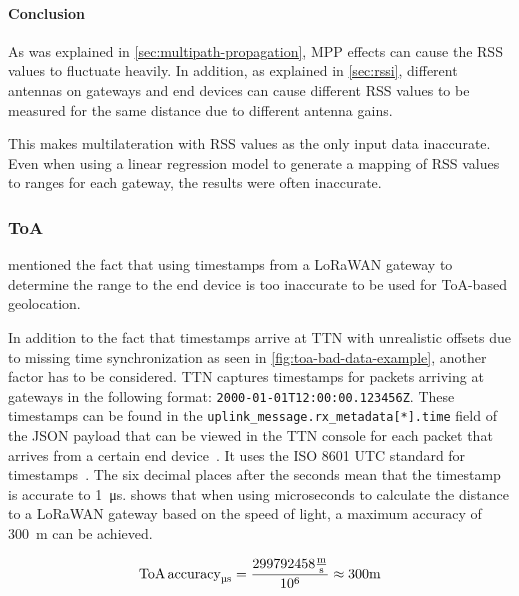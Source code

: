 \paragraph{Conclusion}

As was explained in \cref{sec:multipath-propagation}, \acl{MPP} effects can cause the \ac{RSS} values to fluctuate heavily.
In addition, as explained in \cref{sec:rssi}, different antennas on gateways and end devices can cause different \ac{RSS} values to be measured for the same distance due to different antenna gains.

This makes multilateration with \ac{RSS} values as the only input data inaccurate.
Even when using a linear regression model to generate a mapping of \ac{RSS} values to ranges for each gateway, the results were often inaccurate.

\subsubsection{\acf{ToA}}\label{subsec:conclusion-toa-tdoa}

 mentioned the fact that using timestamps from a \ac{LoRaWAN} gateway to determine the range to the end device is too inaccurate to be used for \ac{ToA}-based geolocation.

In addition to the fact that timestamps arrive at \ac{TTN} with unrealistic offsets due to missing time synchronization as seen in \cref{fig:toa-bad-data-example}, another factor has to be considered.
\ac{TTN} captures timestamps for packets arriving at gateways in the following format: \lstinline|2000-01-01T12:00:00.123456Z|.
These timestamps can be found in the \lstinline|uplink_message.rx_metadata[*].time| field of the \ac{JSON} payload that can be viewed in the \ac{TTN} console for each packet that arrives from a certain end device~\cite{the_things_industries_bv_data_2023}.
It uses the \ac{ISO} 8601 \ac{UTC} standard for timestamps~\cite{newman_date_2002}.
The six decimal places after the seconds mean that the timestamp is accurate to \SI{1}{\micro\second}.
 shows that when using microseconds to calculate the distance to a \ac{LoRaWAN} gateway based on the speed of light, a maximum accuracy of \SI{300}{\meter} can be achieved.

\begin{equation}\label{eq:toa-accuracy-ttn-microseconds}
    \text{ToA\,accuracy}_{\si{\micro\second}} = \frac{299792458 \frac{\si{\meter}}{\si{\second}}}{10^6} \approx 300 \si{\meter}
\end{equation}


